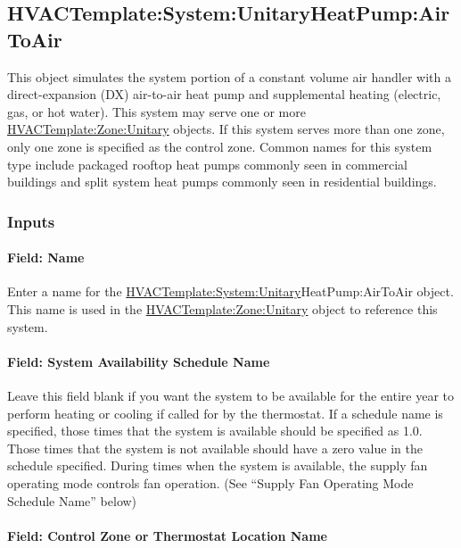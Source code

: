 \subsection{HVACTemplate:System:UnitaryHeatPump:AirToAir}\label{hvactemplatesystemunitaryheatpumpairtoair}

This object simulates the system portion of a constant volume air handler with a direct-expansion (DX) air-to-air heat pump and supplemental heating (electric, gas, or hot water). This system may serve one or more \hyperref[hvactemplatezoneunitary]{HVACTemplate:Zone:Unitary} objects. If this system serves more than one zone, only one zone is specified as the control zone. Common names for this system type include packaged rooftop heat pumps commonly seen in commercial buildings and split system heat pumps commonly seen in residential buildings.

\subsubsection{Inputs}\label{inputs-16-004}

\paragraph{Field: Name}\label{field-name-3-016}

Enter a name for the \hyperref[hvactemplatesystemunitary]{HVACTemplate:System:Unitary}HeatPump:AirToAir object. This name is used in the \hyperref[hvactemplatezoneunitary]{HVACTemplate:Zone:Unitary} object to reference this system.

\paragraph{Field: System Availability Schedule Name}\label{field-system-availability-schedule-name-8}

Leave this field blank if you want the system to be available for the entire year to perform heating or cooling if called for by the thermostat. If a schedule name is specified, those times that the system is available should be specified as 1.0. Those times that the system is not available should have a zero value in the schedule specified. During times when the system is available, the supply fan operating mode controls fan operation. (See ``Supply Fan Operating Mode Schedule Name'' below)

\paragraph{Field: Control Zone or Thermostat Location Name}\label{field-control-zone-or-thermostat-location-name-1}

